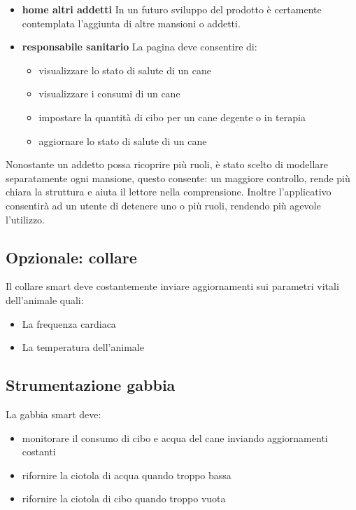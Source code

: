 \begin{itemize}
            \item \textbf{home altri addetti}
                In un futuro sviluppo del prodotto è certamente contemplata l'aggiunta di altre mansioni o addetti.
            \item \textbf{responsabile sanitario}
                La pagina deve consentire di:
               \begin{itemize}
                    \item visualizzare lo stato di salute di un cane
                    \item visualizzare i consumi di un cane
                    \item impostare la quantità di cibo per un cane degente o in terapia
                    \item aggiornare lo stato di salute di un cane
                \end{itemize}
        \end{itemize}
        
    Nonostante un addetto possa ricoprire più ruoli, è stato scelto di modellare separatamente ogni mansione, questo consente: un maggiore controllo, rende più chiara la struttura e aiuta il lettore nella comprensione.
    Inoltre l'applicativo consentirà ad un utente di detenere uno o più ruoli, rendendo più agevole l'utilizzo. 
    \subsection{Opzionale: collare}
        Il collare smart deve costantemente inviare aggiornamenti sui parametri vitali dell'animale quali:
            \begin{itemize}
                \item La frequenza cardiaca
                \item La temperatura dell'animale
            \end{itemize}
    \subsection{Strumentazione gabbia}
        La gabbia smart deve:
            \begin{itemize}
                \item monitorare il consumo di cibo e acqua del cane inviando aggiornamenti costanti
                \item rifornire la ciotola di acqua quando troppo bassa
                \item rifornire la ciotola di cibo quando troppo vuota
            \end{itemize}
